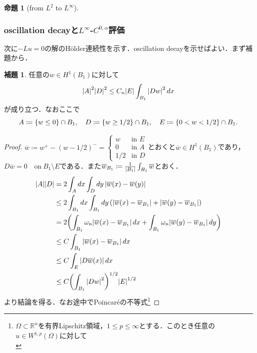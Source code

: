 \documentclass[a4paper]{ltjsarticle}
\newcommand{\Rset}{\mathbb{R}}
\newcommand{\Om}{\Omega}
\newcommand{\on}{\quad \text{on}\ }
\newcommand{\1}{\mathbbm{1}}
\numberwithin{equation}{section}
\theoremstyle{definition}
\newtheorem{prop}[thm]{命題}
\newtheorem{lem}[thm]{補題}
\begin{document}
\begin{prop}[from $L^2$ to $L^\infty$]
\subsubsection{\texorpdfstring{oscillation decayと$L^\infty$-$C^{0,\alpha}$評価}{TEXT}}
次に$-Lu=0$の解のHölder連続性を示す．oscillation decayを示せばよい．まず補題から．
\begin{lem}\label{lem:isoperimetric_ineq_of_degiorgi}
    任意の$w\in H^1(B_1)$に対して
    \begin{equation}
        \abs{A}^2\abs{D}^2\leq C_n \abs{E}\int_{B_1}\abs{Dw}^2\,dx 
    \end{equation}
    が成り立つ．なおここで
    \begin{equation}
        A\coloneqq \qty{w\leq 0}\cap B_1,\quad D\coloneqq \qty{w\geq 1/2}\cap B_1,\quad E\coloneqq \qty{0<w<1/2}\cap B_1.
    \end{equation}
\end{lem}
\begin{proof}
    $\overline{w}\coloneqq w^+-(w-1/2)^-=\begin{cases}
        w & \text{in $E$}\\
        0 & \text{in $A$}\\
        1/2 & \text{in $D$}
    \end{cases}$とおくと$\overline{w}\in H^1(B_1)$であり，$D\overline{w}=0\on B_1\setminus E$である．また$\overline{w}_{B_1}\coloneqq \frac{1}{\abs{B_1}}\int_{B_1}\overline{w}$とおく．
    \begin{align}
        \abs{A}\abs{D}&=2\int_{A}dx\int_{D}dy\,\abs{\overline{w}(x)-\overline{w}(y)}\\
        &\leq 2\int_{B_1}dx\int_{B_1}dy\, \qty(\abs{\overline{w}(x)-\overline{w}_{B_1}}+\abs{\overline{w}(y)-\overline{w}_{B_1}})\\
        &=2\qty(\int_{B_1}\omega_n\abs{\overline{w}(x)-\overline{w}_{B_1}}\,dx+\int_{B_1}\omega_n\abs{\overline{w}(y)-\overline{w}_{B_1}}\,dy)\\
        &\leq C\int_{B_1}\abs{\overline{w}(x)-\overline{w}_{B_1}}\,dx\\
        &\leq C\int_{E}\abs{D\overline{w}(x)}\,dx\\
        &\leq C\qty(\int_{B_1}\abs{Dw}^2)^{1/2}\abs{E}^{1/2}\\
    \end{align}
    より結論を得る．なお途中でPoincaréの不等式\footnote{$\Om\subset \Rset^n$を有界Lipschitz領域，$1\leq p\leq \infty$とする．このとき任意の$u\in W^{1,p}(\Om)$に対して
    \begin{equation}

\end{equation}}
\end{proof}
\end{prop}
\end{document}
